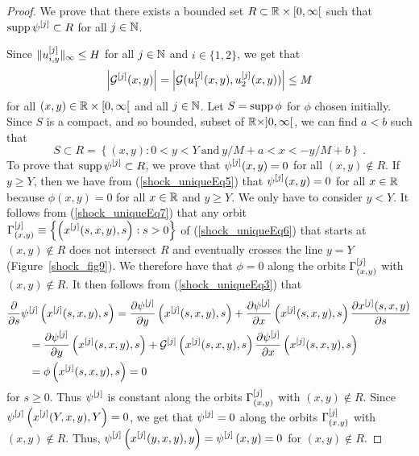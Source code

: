 \begin{proof}

 We prove that there exists a bounded set
$R \subset \RR \times [0,\infty[$ such that
$\DS \supp \psi^{[j]} \subset R$ for all $j \in \NN$.

Since $\DS \|u_{i,y}^{[j]} \|_\infty \leq H$ for all
$j \in \NN$ and $i \in \{1,2\}$, we get that
\begin{equation} \label{shock_uniqueEq7}
\left| {\cal G}^{[j]}(x,y) \right|
= \left|{\cal G}(u^{[j]}_1(x,y),u^{[j]}_2(x,y))\right|
\leq M
\end{equation}
for all $(x,y) \in \RR \times [0,\infty[$ and all $j \in \NN$.
Let $S = \supp \phi$ for $\phi$ chosen initially.  Since $S$ is a
compact, and so bounded, subset of $\RR\times ]0,\infty[$, we can find
$a < b$ such that
\[
S \subset R = \left\{ (x,y) : 0 < y < Y \ \text{and} \
y/M + a < x < -y/M + b \right\} \ .
\]
To prove that $\DS \supp \psi^{[j]} \subset R$, we prove
that $\DS \psi^{[j]}(x,y) = 0$ for all $(x,y) \not\in R$.
If $y \geq Y$, then we have from (\ref{shock_uniqueEq5}) that
$\DS \psi^{[j]}(x,y) = 0$ for all $x \in \RR$
because $\phi(x,y) =0$ for all $x\in \RR$ and $y \geq Y$.  We only have
to consider $y<Y$.  It follows from (\ref{shock_uniqueEq7}) that
any orbit
$\DS \Gamma_{(x,y)}^{[j]}
\equiv \left\{ \left(x^{[j]}(s,x,y),s\right) : s > 0 \right\}$
of (\ref{shock_uniqueEq6}) that starts at $(x,y) \not\in R$
does not intersect $R$ and eventually crosses the line $y=Y$
(Figure~\ref{shock_fig9}).  We
therefore have that $\phi = 0$ along the orbits
$\DS \Gamma_{(x,y)}^{[j]}$ with $(x,y) \not\in R$.
It then follows from (\ref{shock_uniqueEq3}) that
\begin{align}
&\pdfdx{\psi^{[j]}\left(x^{[j]}(s,x,y),s\right)}{s}
= \pdydx{\psi^{[j]}}{y}\left(x^{[j]}(s,x,y),s\right)
+ \pdydx{\psi^{[j]}}{x}\left(x^{[j]}(s,x,y),s\right) \pdydx{x^{[j]}(s,x,y)}{s}
\nonumber \\
&\qquad = \pdydx{\psi^{[j]}}{y}\left(x^{[j]}(s,x,y),s\right)
+ {\cal G}^{[j]}\left(x^{[j]}(s,x,y),s\right)
\pdydx{\psi^{[j]}}{x}\left(x^{[j]}(s,x,y),s\right) \nonumber \\
&\qquad = \phi\left(x^{[j]}(s,x,y),s\right) = 0 \label{shock_uniqueEq11}
\end{align}
for $s \geq 0$.  Thus $\DS \psi^{[j]}$ is constant along the
orbits $\DS \Gamma_{(x,y)}^{[j]}$ with $(x,y) \not\in R$.  Since\\
$\DS \psi^{[j]}\left(x^{[j]}(Y,x,y),Y\right) = 0$,
we get that $\DS \psi^{[j]} = 0$ along the orbits
$\DS \Gamma_{(x,y)}^{[j]}$ with $(x,y) \not\in R$.  Thus,
$\DS \psi^{[j]}\left(x^{[j]}(y,x,y),y\right) =
\psi^{[j]}\left(x,y\right) = 0$ for $(x,y) \not\in R$.


\end{proof}
